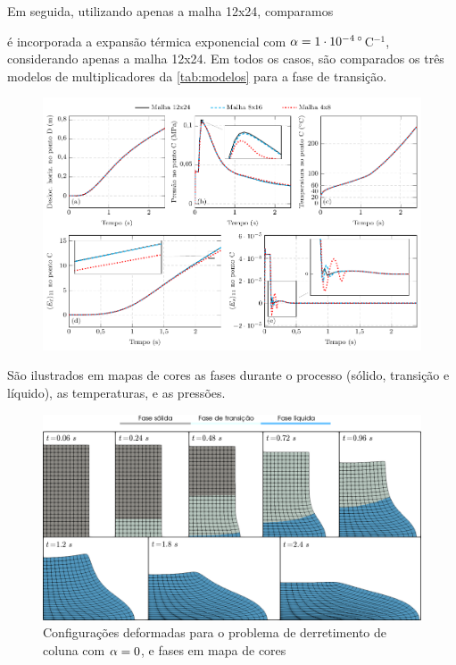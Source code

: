 \documentclass[Tese.tex]{subfiles}
\begin{document}
Em seguida, utilizando apenas a malha 12x24, comparamos

é incorporada a expansão térmica exponencial com $\alpha = 1\cdot 10^{-4}\,^{\circ}$C$^{-1}$, considerando apenas a malha 12x24. Em todos os casos, são comparados os três modelos de multiplicadores da \cref{tab:modelos} para a fase de transição.

\begin{figure}[!htb]
	\centering
	\caption{}
	\label{fig:PhaseChangeDamSolidToLiquid-meshConvergence}
	\includegraphics[scale=1.0]{Figuras/PhaseChangeDam/PhaseChangeDamSolidToLiquid-meshConvergence.pdf}
\end{figure}


 São ilustrados em mapas de cores as fases durante o processo (sólido, transição e líquido), as temperaturas, e as pressões.

\begin{figure}[!htb]
	\centering
	\caption{Configurações deformadas para o problema de derretimento de coluna com $\alpha = 0$, e fases em mapa de cores}
	\label{fig:PhaseChangeDam-phase}
	\includegraphics[width=\textwidth]{Figuras/PhaseChangeDam/phase.png}
\end{figure}
\end{document}
